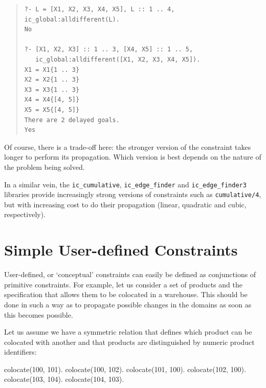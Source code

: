 \begin{quote}\begin{verbatim}
?- L = [X1, X2, X3, X4, X5], L :: 1 .. 4, ic_global:alldifferent(L).
No

?- [X1, X2, X3] :: 1 .. 3, [X4, X5] :: 1 .. 5,
   ic_global:alldifferent([X1, X2, X3, X4, X5]).
X1 = X1{1 .. 3}
X2 = X2{1 .. 3}
X3 = X3{1 .. 3}
X4 = X4{[4, 5]}
X5 = X5{[4, 5]}
There are 2 delayed goals.
Yes
\end{verbatim}\end{quote}

Of course, there is a trade-off here: the stronger version of the constraint
takes longer to perform its propagation.  Which version is best depends on
the nature of the problem being solved.



In a similar vein, the \texttt{ic_cumulative}, \texttt{ic_edge_finder} and
\texttt{ic_edge_finder3} libraries provide increasingly strong versions of
constraints such as \texttt{cumulative/4}, but with increasing cost to do
their propagation (linear, quadratic and cubic, respectively).



\section{Simple User-defined Constraints}
User-defined, or `conceptual' constraints can easily be defined as 
conjunctions of primitive constraints. For example, let us consider a set 
of products and the specification that allows them to be colocated in a 
warehouse. This should be done in such a way as to propagate possible 
changes in the domains as soon as this becomes possible.  

Let us assume we have a symmetric relation that defines which product
can be colocated with another and that products are distinguished by numeric 
product identifiers: 

\begin{code}
colocate(100, 101).
colocate(100, 102).
colocate(101, 100).
colocate(102, 100).
colocate(103, 104).
colocate(104, 103).
\end{code}

